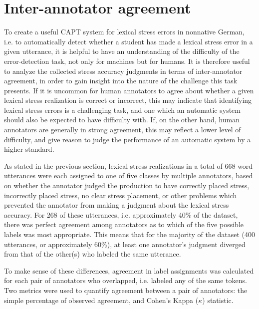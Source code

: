 	
	\section{Inter-annotator agreement}
	\label{sec:lexstress:agreement}	
	
	To create a useful CAPT system for lexical stress errors in nonnative German, i.e. to automatically detect whether a student has made a lexical stress error in a given utterance, it is helpful to have an understanding of the difficulty of the error-detection task, not only for machines but for humans. It is therefore useful to analyze the collected stress accuracy judgments in terms of inter-annotator agreement, in order to gain insight into the nature of the challenge this task presents. If it is uncommon for human annotators to agree about whether a given lexical stress realization is correct or incorrect, this may indicate that  identifying lexical stress errors is a challenging task, and one which an automatic system should also be expected to have difficulty with. If, on the other hand, human annotators are generally in strong agreement, this may reflect a lower level of difficulty, and give reason to judge the performance of an automatic system by a higher standard.  
	
	As stated in the previous section,
	lexical stress realizations in a total of 
	668 word utterances were each assigned to one of five classes by multiple annotators, based on whether the annotator judged the production to have correctly placed stress, incorrectly placed stress, no clear stress placement, or other problems which prevented the annotator from making a judgment about the lexical stress accuracy. 
	For 268 of these utterances, i.e. approximately 40\% of the dataset, there was perfect agreement among annotators as to which of the five possible labels was most appropriate. This means that for the majority of the dataset (400 utterances, or approximately 60\%), at least one annotator's judgment diverged from that of the other(s) who labeled the same utterance.
	
	
	To make sense of these differences,  
	agreement in label assignments was calculated for each pair of annotators who overlapped, i.e. labeled any of the same tokens. 
		Two metrics were used to quantify agreement between a pair of annotators: the simple percentage of observed agreement, and Cohen's Kappa ($\kappa$) statistic. 
		
